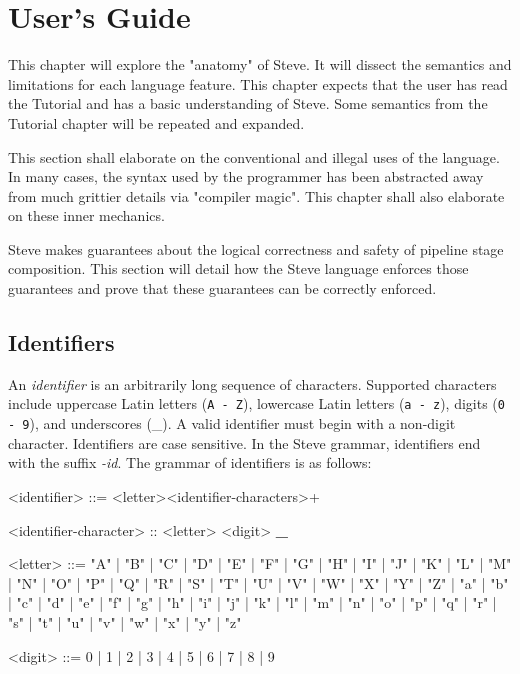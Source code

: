 \chapter{User's Guide} \label{users_guide}

This chapter will explore the "anatomy" of Steve. It will dissect the semantics and limitations for each language feature. This chapter expects that the user has read the Tutorial and has a basic understanding of Steve. Some semantics from the Tutorial chapter will be repeated and expanded.

This section shall elaborate on the conventional and illegal uses of the language. In many cases, the syntax used by the programmer has been abstracted away from much grittier details via "compiler magic". This chapter shall also elaborate on these inner mechanics.

Steve makes guarantees about the logical correctness and safety of pipeline stage composition. This section will detail how the Steve language enforces those guarantees and prove that these guarantees can be correctly enforced.

\section{Identifiers} \label{identifiers_guide}

An \textit{identifier} is an arbitrarily long sequence of characters. Supported characters include uppercase Latin letters (\texttt{A - Z}), lowercase Latin letters (\texttt{a - z}), digits (\texttt{0 - 9}), and underscores (\_). A valid identifier must begin with a non-digit character. Identifiers are case sensitive. In the Steve grammar, identifiers end with the suffix \textit{-id}. The grammar of identifiers is as follows:

\begin{minip}
\begin{grammar}
<identifier> ::= <letter><identifier-characters>+

<identifier-character> :: <letter>
\alt <digit>
\alt \textbf{\_}

<letter> ::= "A" | "B" | "C" | "D" | "E" | "F" | "G"
       | "H" | "I" | "J" | "K" | "L" | "M" | "N"
       | "O" | "P" | "Q" | "R" | "S" | "T" | "U"
       | "V" | "W" | "X" | "Y" | "Z" | "a" | "b"
       | "c" | "d" | "e" | "f" | "g" | "h" | "i"
       | "j" | "k" | "l" | "m" | "n" | "o" | "p"
       | "q" | "r" | "s" | "t" | "u" | "v" | "w"
       | "x" | "y" | "z"

<digit> ::= 0 | 1 | 2 | 3 | 4 | 5 | 6 | 7 | 8 | 9
\end{grammar}
\end{minip}

